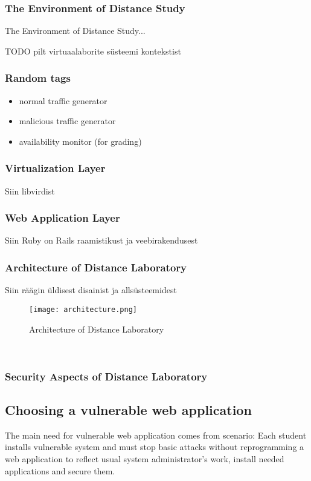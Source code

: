 \subsubsection{The Environment of Distance Study}
\label{The Environment of Distance Study}
The Environment of Distance Study...

TODO pilt virtuaalaborite süsteemi kontekstist
\subsubsection{Random tags}
\begin{itemize}
	\item normal traffic generator
	\item malicious traffic generator
	\item availability monitor (for grading)
\end{itemize}

\subsubsection{Virtualization Layer}
Siin libvirdist
\subsubsection{Web Application Layer}
Siin Ruby on Rails raamistikust ja veebirakendusest
\subsubsection{Architecture of Distance Laboratory}
Siin räägin üldisest disainist ja allsüsteemidest
\
\begin{figure}[ht]
\centering
\texttt{[image: architecture.png]}
\caption{Architecture of Distance Laboratory}
\label{fig:Architecture of Distance Laboratory}
\end{figure}
\

\subsubsection{Security Aspects of Distance Laboratory}

\subsection{Choosing a vulnerable web application}

The main need for vulnerable web application comes from scenario: Each student installs vulnerable system and must stop basic attacks without reprogramming a web application to reflect usual system administrator's work,  install needed applications and secure them.

